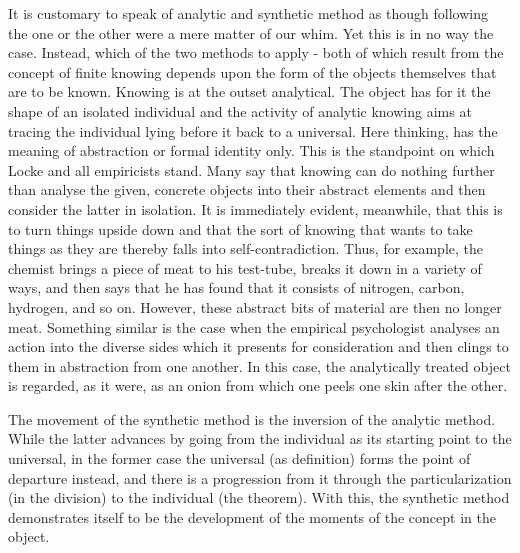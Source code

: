 It is customary to speak of analytic and synthetic method as though
following the one or the other were a mere matter of our whim. Yet this is in
no way the case. Instead, which of the two methods to apply - both of which
result from the concept of finite knowing depends upon the form of the objects
themselves that are to be known. Knowing is at the outset analytical.
The object has for it the shape of an isolated individual
and the activity of analytic knowing aims at tracing the individual lying before
it back to a universal. Here thinking, has the meaning of abstraction or formal
identity only. This is the standpoint on which Locke and all empiricists stand.
Many say that knowing can do nothing further than analyse the given, concrete
objects into their abstract elements and then consider the latter in
isolation. It is immediately evident, meanwhile, that this is to turn things upside
down and that the sort of knowing that wants to take things as they are thereby
falls into self-contradiction. Thus, for example, the chemist brings a piece of meat
to his test-tube, breaks it down in a variety of ways, and then says that he has found
that it consists of nitrogen, carbon, hydrogen, and so on. However, these abstract
bits of material are then no longer meat. Something similar is the case when the
empirical psychologist analyses an action into the diverse sides which it presents
for consideration and then clings to them in abstraction from one another. In this
case, the analytically treated object is regarded, as it were, as an onion
from which one peels one skin after the other.

The movement of the synthetic method is the inversion of the analytic method.
While the latter advances by going from the individual as its starting point
to the universal, in the former case the universal (as definition) forms the point of
departure instead, and there is a progression from it through the particularization
(in the division) to the individual (the theorem). With this, the synthetic method
demonstrates itself to be the development of the moments of the concept in the
object.

